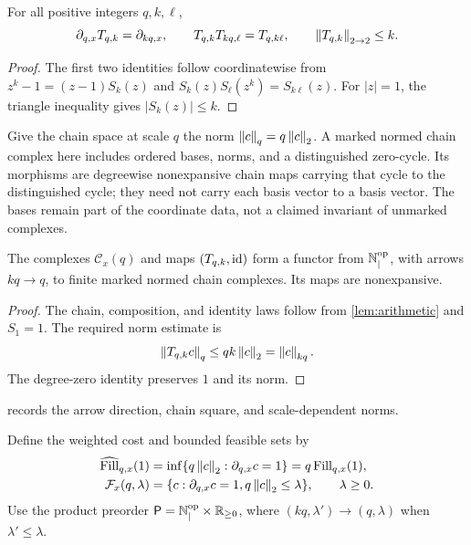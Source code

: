 \documentclass[11pt,a4paper]{article}
\begin{document}
\begin{lemma}\label{lem:arithmetic}
For all positive integers $q,k,\ell$,
\[
 \partial_{q,x}T_{q,k}=\partial_{kq,x},\qquad
 T_{q,k}T_{kq,\ell}=T_{q,k\ell},\qquad
 \left\lVert T_{q,k}\right\rVert_{2\to2}\leq k.
\]
\end{lemma}

\begin{proof}
The first two identities follow coordinatewise from
$z^k-1=(z-1)S_k(z)$ and $S_k(z)S_\ell(z^k)=S_{k\ell}(z)$.
For $|z|=1$, the triangle inequality gives $|S_k(z)|\leq k$.
\end{proof}

Give the chain space at scale $q$ the norm $\left\lVert c\right\rVert_q=q\left\lVert c\right\rVert_2$.
A marked normed chain complex here includes ordered bases, norms, and a
distinguished zero-cycle.  Its morphisms are degreewise nonexpansive chain
maps carrying that cycle to the distinguished cycle; they need not carry
each basis vector to a basis vector.  The bases remain part of the
coordinate data, not a claimed invariant of unmarked complexes.

\begin{proposition}\label{prop:diagram}
The complexes $\mathcal C_x(q)$ and maps $(T_{q,k},\operatorname{id})$ form a functor
from $\mathbb N_{\mid}^{\mathrm{op}}$, with arrows $kq\to q$, to finite marked
normed chain complexes.  Its maps are nonexpansive.
\end{proposition}

\begin{proof}
The chain, composition, and identity laws follow from
\cref{lem:arithmetic} and $S_1=1$.  The required norm estimate is
\[
 \left\lVert T_{q,k}c\right\rVert_q\leq qk\left\lVert c\right\rVert_2=\left\lVert c\right\rVert_{kq}.
\]
The degree-zero identity preserves $1$ and its norm.
\end{proof}

 records the arrow direction, chain square,
and scale-dependent norms.


Define the weighted cost and bounded feasible sets by
\begin{align}
 \operatorname{\widehat{Fill}}_{q,x}(1)&=\inf\{q\left\lVert c\right\rVert_2:\partial_{q,x}c=1\}
                   =q\operatorname{Fill}_{q,x}(1),\label{eq:weighted-cost}\\
 \mathcal F_x(q,\lambda)&=\{c:\partial_{q,x}c=1,
                                  q\left\lVert c\right\rVert_2\leq\lambda\},
                                  \qquad\lambda\geq0.
 \label{eq:feasible}
\end{align}
Use the product preorder
$\mathsf P=\mathbb N_{\mid}^{\mathrm{op}}\times\mathbb R_{\geq0}$, where
$(kq,\lambda')\to(q,\lambda)$ when $\lambda'\leq\lambda$.
\end{document}
